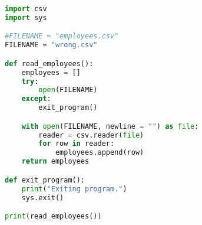 \documentclass{article}
\begin{document}
\begin{lstlisting}[language=Python]
import csv
import sys

#FILENAME = "employees.csv"
FILENAME = "wrong.csv"

def read_employees():
    employees = []
    try:
        open(FILENAME)
    except:
        exit_program()

    with open(FILENAME, newline = "") as file:
        reader = csv.reader(file)
        for row in reader:
            employees.append(row)
    return employees

def exit_program():
    print("Exiting program.")
    sys.exit()

print(read_employees())
\end{lstlisting}
\end{document}
